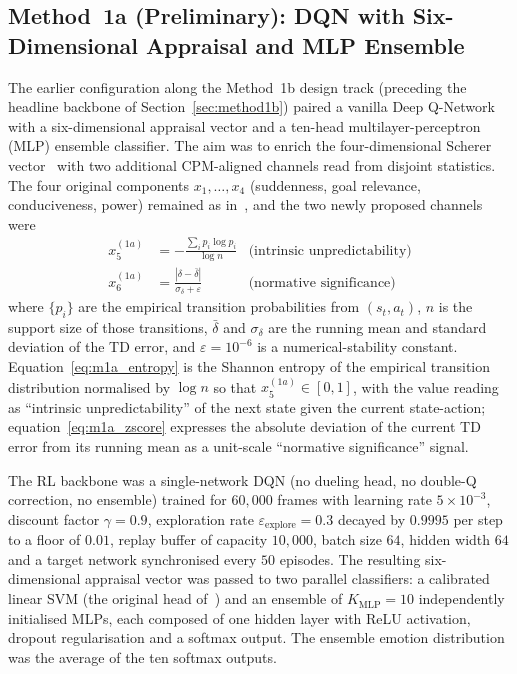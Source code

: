 \documentclass[conference]{IEEEtran}
\begin{document}
\subsection{Method~1a (Preliminary): DQN with Six-Dimensional Appraisal and MLP Ensemble}
\label{sec:method1a}
The earlier configuration along the Method~1b design track (preceding
the headline backbone of Section~\ref{sec:method1b}) paired a vanilla
Deep Q-Network with a six-dimensional appraisal vector and a ten-head
multilayer-perceptron (MLP) ensemble classifier. The aim was
to enrich the four-dimensional Scherer
vector~\cite{zhang2023modeling} with two additional CPM-aligned
channels read from disjoint statistics. The four original components
$x_{1},\dots,x_{4}$ (suddenness, goal relevance, conduciveness, power)
remained as in~\cite{zhang2023modeling}, and the two newly proposed
channels were
\begin{align}
x_{5}^{(1a)} &= -\frac{\sum_{i} p_{i}\log p_{i}}{\log n}
   & \text{(intrinsic unpredictability)} \label{eq:m1a_entropy}\\[2pt]
x_{6}^{(1a)} &= \frac{|\delta - \bar\delta|}{\sigma_{\delta} + \varepsilon}
   & \text{(normative significance)} \label{eq:m1a_zscore}
\end{align}
where $\{p_{i}\}$ are the empirical transition probabilities from
$(s_{t}, a_{t})$, $n$ is the support size of those transitions,
$\bar\delta$ and $\sigma_{\delta}$ are the running mean and standard
deviation of the TD error, and $\varepsilon = 10^{-6}$ is a
numerical-stability constant. Equation~\eqref{eq:m1a_entropy} is the
Shannon entropy of the empirical transition distribution normalised by
$\log n$ so that $x_{5}^{(1a)} \in [0, 1]$, with the value reading as
``intrinsic unpredictability'' of the next state given the current
state-action; equation~\eqref{eq:m1a_zscore} expresses the absolute
deviation of the current TD error from its running mean as a
unit-scale ``normative significance'' signal.

The RL backbone was a single-network DQN (no dueling head, no
double-Q correction, no ensemble) trained for $60{,}000$ frames with
learning rate $5\!\times\!10^{-3}$, discount factor $\gamma = 0.9$,
exploration rate $\varepsilon_{\text{explore}} = 0.3$ decayed by
$0.9995$ per step to a floor of $0.01$, replay buffer of capacity
$10{,}000$, batch size $64$, hidden width $64$ and a target network
synchronised every $50$ episodes. The resulting six-dimensional
appraisal vector was passed to two parallel classifiers: a calibrated
linear SVM (the original head of~\cite{zhang2023modeling}) and an
ensemble of $K_{\text{MLP}} = 10$ independently initialised MLPs, each
composed of one hidden layer with ReLU activation, dropout
regularisation and a softmax output. The ensemble emotion distribution
was the average of the ten softmax outputs.
\end{document}
